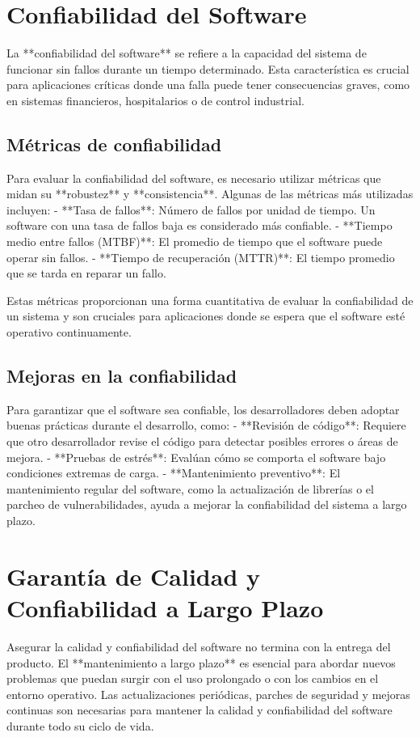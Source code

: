 \documentclass[12pt]{article}
\begin{document}
\section{Confiabilidad del Software}
La **confiabilidad del software** se refiere a la capacidad del sistema de funcionar sin fallos durante un tiempo determinado. Esta característica es crucial para aplicaciones críticas donde una falla puede tener consecuencias graves, como en sistemas financieros, hospitalarios o de control industrial.

\subsection{Métricas de confiabilidad}
Para evaluar la confiabilidad del software, es necesario utilizar métricas que midan su **robustez** y **consistencia**. Algunas de las métricas más utilizadas incluyen:
- **Tasa de fallos**: Número de fallos por unidad de tiempo. Un software con una tasa de fallos baja es considerado más confiable.
- **Tiempo medio entre fallos (MTBF)**: El promedio de tiempo que el software puede operar sin fallos.
- **Tiempo de recuperación (MTTR)**: El tiempo promedio que se tarda en reparar un fallo.

Estas métricas proporcionan una forma cuantitativa de evaluar la confiabilidad de un sistema y son cruciales para aplicaciones donde se espera que el software esté operativo continuamente.

\subsection{Mejoras en la confiabilidad}
Para garantizar que el software sea confiable, los desarrolladores deben adoptar buenas prácticas durante el desarrollo, como:
- **Revisión de código**: Requiere que otro desarrollador revise el código para detectar posibles errores o áreas de mejora.
- **Pruebas de estrés**: Evalúan cómo se comporta el software bajo condiciones extremas de carga.
- **Mantenimiento preventivo**: El mantenimiento regular del software, como la actualización de librerías o el parcheo de vulnerabilidades, ayuda a mejorar la confiabilidad del sistema a largo plazo.

\section{Garantía de Calidad y Confiabilidad a Largo Plazo}
Asegurar la calidad y confiabilidad del software no termina con la entrega del producto. El **mantenimiento a largo plazo** es esencial para abordar nuevos problemas que puedan surgir con el uso prolongado o con los cambios en el entorno operativo. Las actualizaciones periódicas, parches de seguridad y mejoras continuas son necesarias para mantener la calidad y confiabilidad del software durante todo su ciclo de vida.
\end{document}
